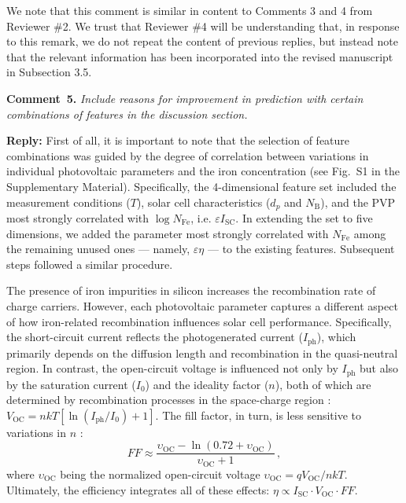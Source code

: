 \documentclass[a4paper,fleqn]{cas-sc}
\begin{document}
We note that this comment is similar in content to Comments 3 and 4 from Reviewer \#2.
We trust that Reviewer \#4 will be understanding that, in response to this remark, we do not repeat the content of previous replies,
but instead note that the relevant information has been incorporated into the revised manuscript in Subsection 3.5.



\vspace{1cm}
\noindent
\textcolor[rgb]{0.00,0.50,1.00}{\textbf{Comment~5.}}
\emph{Include reasons for improvement in prediction with certain combinations of features in the discussion section.}

\noindent
\textcolor[rgb]{0.51,0.00,0.00}{\textbf{Reply:}}
First of all, it is important to note that the selection of feature combinations was guided
by the degree of correlation between variations in individual photovoltaic parameters and the iron concentration (see Fig.~S1 in the Supplementary Material).
Specifically, the 4-dimensional feature set included the measurement conditions ($T$),
solar cell characteristics ($d_p$ and $N_\mathrm{B}$), and the PVP most strongly correlated with $\log N_\mathrm{Fe}$, i.e. $\varepsilon I_\mathrm{SC}$.
In extending the set to five dimensions, we added the parameter most strongly correlated with $N_\mathrm{Fe}$
among the remaining unused ones --- namely,  $\varepsilon \eta$  --- to the existing features.
Subsequent steps followed a similar procedure.

The presence of iron impurities in silicon increases the recombination rate of charge carriers.
However, each photovoltaic parameter captures a different aspect of how iron-related recombination influences solar cell performance.
Specifically, the short-circuit current reflects the photogenerated current ($I_\mathrm{ph}$),
which primarily depends on the diffusion length and recombination in the quasi-neutral region.
In contrast, the open-circuit voltage is influenced not only by $I_\mathrm{ph}$ but also by the saturation current ($I_0$)
and the ideality factor ($n$), both of which are determined by recombination processes in the space-charge region \cite{YangHandbookPVSi}:
$ V_\mathrm{OC} = nkT\left[ {\ln\left( {I_\mathrm{ph}/{I_0}} \right)+1} \right]$.
The fill factor, in turn, is less sensitive to variations in $n$ \cite{Green1982}:
\begin{equation}
\label{eqFF2}
    F\!F \approx \frac{\upsilon_\mathrm{OC}-\ln\left(0.72+\upsilon_\mathrm{OC}\right)}{\upsilon_\mathrm{OC}+1} \,,
\end{equation}
where
$\upsilon_\mathrm{OC}$ being the normalized open-circuit voltage
$\upsilon_\mathrm{OC}=qV_\mathrm{OC}/nkT$.
Ultimately, the efficiency integrates all of these effects: $\eta \propto I_\mathrm{SC}\cdot V_\mathrm{OC}\cdot F\!F$.
\end{document}
